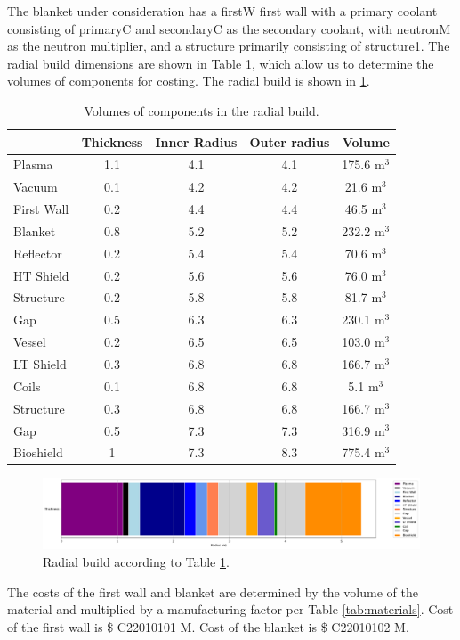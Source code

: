 The blanket under consideration has a firstW first wall with a primary coolant consisting of primaryC and secondaryC as the secondary coolant, with neutronM as the neutron multiplier, and a structure primarily consisting of structure1. The radial build dimensions are shown in Table \ref{tab:volumes}, which allow us to determine the volumes of components for costing.  The radial build is shown in \ref{fig:radial}.  \\


\begin{table}[h!]
    \centering
    \begin{tabular}{l c  c c c}
    \hline
        &	Thickness	&	Inner Radius	&	Outer radius	&	Volume		\\
        \hline
Plasma	&	1.1	&	4.1	&	4.1	&	175.6	m$^{3}$	\\
Vacuum	&	0.1	&	4.2	&	4.2	&	21.6	m$^{3}$	\\
First Wall	&	0.2	&	4.4	&	4.4	&	46.5	m$^{3}$	\\
Blanket	&	0.8	&	5.2	&	5.2	&	232.2	m$^{3}$	\\
Reflector	&	0.2	&	5.4	&	5.4	&	70.6	m$^{3}$	\\
HT Shield	&	0.2	&	5.6	&	5.6	&	76.0	m$^{3}$	\\
Structure	&	0.2	&	5.8	&	5.8	&	81.7	m$^{3}$	\\
Gap	&	0.5	&	6.3	&	6.3	&	230.1	m$^{3}$	\\
Vessel	&	0.2	&	6.5	&	6.5	&	103.0	m$^{3}$	\\
LT Shield	&	0.3	&	6.8	&	6.8	&	166.7	m$^{3}$	\\
Coils	&	0.1	&	6.8	&	6.8	&	5.1	m$^{3}$	\\
Structure	&	0.3	&	6.8	&	6.8	&	166.7	m$^{3}$	\\
Gap	&	0.5	&	7.3	&	7.3	&	316.9	m$^{3}$	\\
Bioshield	&	1	&	7.3	&	8.3	&	775.4	m$^{3}$	\\

        \hline
    \end{tabular}
    \caption{Volumes of components in the radial build.}
    \label{tab:volumes}
\end{table}

\begin{figure}
    \centering
    \includegraphics[width=0.9\linewidth]{Figures/radial_build.pdf}
    \caption{Radial build according to Table \ref{tab:volumes}.}
    \label{fig:radial}
\end{figure}



The costs of the first wall and blanket are determined by the volume of the material and multiplied by a manufacturing factor per Table \ref{tab:materials}.   Cost of the first wall is \$ C22010101 M.  Cost of the blanket is \$ C22010102 M.

